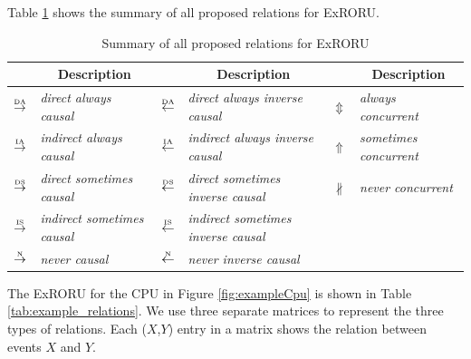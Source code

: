 \documentclass{llncs}
\begin{document}
Table \ref{tab:relations} shows the summary of all proposed relations for ExRORU.
\\
\begin{table}[htbp]
\centering
\caption{Summary of all proposed relations for ExRORU\label{tab:relations}}
	\begin{tabular}{|c|l||c|l||c|l|} \hline
		& \multicolumn{1}{c||}{\multirow{1}{*}{Description}} & & \multicolumn{1}{c||}{\multirow{1}{*}{Description}} & & \multicolumn{1}{c|}{\multirow{1}{*}{Description}}\\ \hline
		$\overset{\text{\tiny{DA}}}{\rightarrow}$ & \textit{direct always causal} & $\overset{\text{\tiny{DA}}}{\leftarrow}$ & \textit{direct always inverse causal} & $\Updownarrow$ & \textit{always concurrent}\\
		$\overset{\text{\tiny{IA}}}{\rightarrow}$ & \textit{indirect always causal} & $\overset{\text{\tiny{IA}}}{\leftarrow}$ & \textit{indirect always inverse causal} & $\Uparrow$ & \textit{sometimes concurrent}\\
		$\overset{\text{\tiny{DS}}}{\rightarrow}$ & \textit{direct sometimes causal} & $\overset{\text{\tiny{DS}}}{\leftarrow}$ & \textit{direct sometimes inverse causal} & $\nparallel$ & \textit{never concurrent}\\
		$\overset{\text{\tiny{IS}}}{\rightarrow}$ & \textit{indirect sometimes causal} & $\overset{\text{\tiny{IS}}}{\leftarrow}$ & \textit{indirect sometimes inverse causal} & & \\
		$\overset{\text{\tiny{N}}}{\rightarrow}$ & \textit{never causal} & $\overset{\text{\tiny{N}}}{\leftarrow}$ & \textit{never inverse causal} & & \\
		\hline
	\end{tabular}
\end{table}

\begin{example}\label{ex:computation}
The ExRORU for the CPU in Figure \ref{fig:exampleCpu} is shown in Table \ref{tab:example_relations}. We use three separate matrices to represent the three types of relations. Each ($X$,$Y$) entry in a matrix shows the relation between events $X$ and $Y$.
\end{example}
\end{document}
